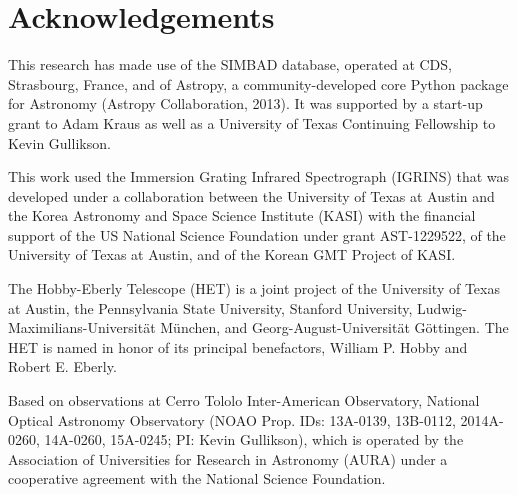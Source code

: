 \documentclass{emulateapj}
\begin{document}
\section*{Acknowledgements}
This research has made use of the SIMBAD database, operated at CDS, Strasbourg, France, and of Astropy, a community-developed core Python package for Astronomy (Astropy Collaboration, 2013).
It was supported by a start-up grant to Adam Kraus as well as a University of Texas Continuing Fellowship to Kevin Gullikson.

This work used the Immersion Grating Infrared Spectrograph (IGRINS) that was developed under a collaboration between the University of Texas at Austin and the Korea Astronomy and Space Science Institute (KASI) with the financial support of the US National Science Foundation under grant AST-1229522, of the University of Texas at Austin, and of the Korean GMT Project of KASI.

The Hobby-Eberly Telescope (HET) is a joint project of the University of Texas at Austin, the Pennsylvania State University, Stanford University, Ludwig-Maximilians-Universit\"at M\"unchen, and Georg-August-Universit\"at G\"ottingen. The HET is named in honor of its principal benefactors, William P. Hobby and Robert E. Eberly.

Based on observations at Cerro Tololo Inter-American Observatory, National Optical Astronomy Observatory (NOAO Prop. IDs: 13A-0139, 13B-0112, 2014A-0260, 14A-0260, 15A-0245; PI: Kevin Gullikson), which is operated by the Association of Universities for Research in Astronomy (AURA) under a cooperative agreement with the National Science Foundation. 
\end{document}
